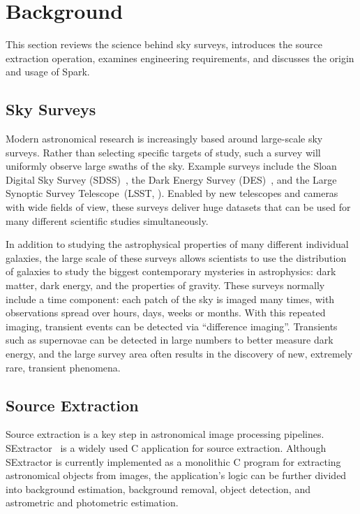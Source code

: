 \documentclass[conference]{IEEEtran}
\begin{document}
\section{Background}
\label{sec:Background}

This section reviews the science behind sky surveys, introduces the source extraction operation, examines engineering requirements, and discusses the origin and usage of Spark.

\subsection{Sky Surveys}

Modern astronomical research is increasingly based around large-scale sky surveys.
Rather than selecting specific targets of study, such a survey will uniformly observe large
swaths of the sky. Example surveys include the Sloan Digital Sky Survey (SDSS)~\cite{york00},
the Dark Energy Survey (DES)~\cite{dark05}, and the Large Synoptic Survey Telescope~(LSST,
\cite{ivezic08}). Enabled by new telescopes and cameras with wide fields of view, these
surveys deliver huge datasets that can be used for many different scientific studies
simultaneously.

In addition to studying the astrophysical properties of many different individual galaxies,
the large scale of these surveys allows scientists to use the distribution of galaxies to
study the biggest contemporary mysteries in astrophysics: dark matter, dark energy, and 
the properties of gravity. These surveys normally include a time component: each patch of the sky is imaged many times,
with observations spread over hours, days, weeks or months. With this repeated imaging,
transient events can be detected via ``difference imaging''. Transients such as supernovae
can be detected in large numbers to better measure dark energy, and the large survey area
often results in the discovery of new, extremely rare, transient phenomena.

\subsection{Source Extraction}
\label{sec:Background-SE}
Source extraction is a key step in astronomical image processing pipelines.
SExtractor~\cite{bertin96} is a widely used C application for source extraction.
Although SExtractor is currently implemented as a monolithic C program for extracting astronomical
objects from images, the application's logic can be further divided into 
background estimation, background removal, object detection, and astrometric 
and photometric estimation.
\end{document}
